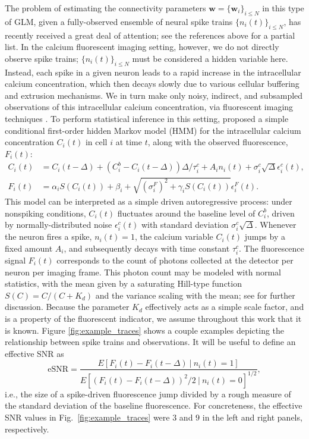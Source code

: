 \documentclass[aoas,preprint]{imsart}
\newcommand{\w}{w}
\newcommand{\bw}{\mathbf{\w}}
\begin{document}
The problem of estimating the connectivity parameters
$\bw=\{\bw_i\}_{i\leq N}$ in this type of GLM, given a fully-observed
ensemble of neural spike trains $\{n_i(t)\}_{i\leq N}$, has recently
received a great deal of attention; see the references above for a
partial list. In the calcium fluorescent imaging setting, however, we
do not directly observe spike trains; $\{n_i(t)\}_{i\leq N}$ must be
considered a hidden variable here. Instead, each spike in a given
neuron leads to a rapid increase in the intracellular calcium
concentration, which then decays slowly due to various cellular
buffering and extrusion mechanisms. We in turn make only noisy,
indirect, and subsampled observations of this intracellular calcium
concentration, via fluorescent imaging techniques
\cite{ImagingManual}. To perform statistical inference in this
setting, \cite{Vogelstein2009} proposed a simple conditional
first-order hidden Markov model (HMM) for the intracellular calcium
concentration $C_i(t)$ in cell $i$ at time $t$, along with the
observed fluorescence, $F_i(t)$:
\begin{align}
\label{eqn:ca:definition}
C_i(t) &= C_i(t-\Delta) + \left( C_i^b-C_i(t-\Delta) \right) \Delta /
\tau^c_i + A_i n_i(t) + \sigma^c_i \sqrt{\Delta} \epsilon^c_i(t), \\
F_i(t) &= \alpha_i S(C_i(t)) + \beta_i + \sqrt{(\sigma^F_i)^2 +
\gamma_i S(C_i(t)) } \epsilon^F_i(t). \label{eqn:F:definition}
\end{align}
This model can be interpreted as a simple driven autoregressive
process: under nonspiking conditions, $C_i(t)$ fluctuates around the
baseline level of $C_i^b$, driven by normally-distributed noise
$\epsilon^c_i(t)$ with standard deviation $\sigma^c_i
\sqrt{\Delta}$. Whenever the neuron fires a spike, $n_i(t)=1$, the
calcium variable $C_i(t)$ jumps by a fixed amount $A_i$, and
subsequently decays with time constant $\tau^c_i$. The fluorescence
signal $F_i(t)$ corresponds to the count of photons collected at the
detector per neuron per imaging frame. This photon count may be
modeled with normal statistics, with the mean given by a saturating
Hill-type function $S(C)=C/(C+K_d)$ \cite{Yasuda2004} and the variance
scaling with the mean; see \cite{Vogelstein2009} for further
discussion.  Because the parameter $K_d$ effectively acts as a simple
scale factor, and is a property of the fluorescent indicator, we
assume throughout this work that it is known. Figure
\ref{fig:example_traces} shows a couple examples depicting the
relationship between spike trains and observations.  It will be useful
to define an effective SNR as
\begin{equation}
\text{eSNR} = \frac{E[F_i(t)-F_i(t-\Delta) ~|~ n_i(t)=1]}
{E[(F_i(t)-F_i(t-\Delta))^2/2 ~|~ n_i(t)=0]^{1/2}},
\label{eq:eSNR}
\end{equation}
i.e., the size of a spike-driven fluorescence jump divided by a rough
measure of the standard deviation of the baseline fluorescence.  For
concreteness, the effective SNR values in
Fig.~\ref{fig:example_traces} were $3$ and $9$ in the left and right
panels, respectively.
\end{document}
